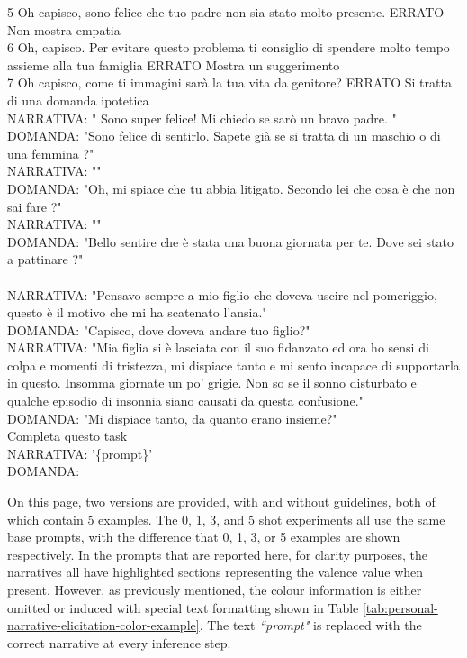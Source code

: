 \begin{itemize}
{       5	Oh capisco, sono felice che tuo padre non sia stato molto presente.	ERRATO	Non mostra empatia\\
       6	Oh, capisco. Per evitare questo problema ti consiglio di spendere molto tempo assieme alla tua famiglia	ERRATO	Mostra un suggerimento\\
       7	Oh capisco, come ti immagini sarà la tua vita da genitore?	ERRATO	Si tratta di una domanda ipotetica\\
      NARRATIVA: " Sono super felice! Mi chiedo se sarò un bravo padre. "\\
       DOMANDA: "Sono felice di sentirlo. Sapete già se si tratta di un maschio o di una femmina ?"\\
       NARRATIVA: ""\\
       DOMANDA: "Oh, mi spiace che tu abbia litigato. Secondo lei che cosa è che non sai fare ?"\\
       NARRATIVA: ""\\
       DOMANDA: "Bello sentire che è stata una buona giornata per te. Dove sei stato a pattinare ?"\\
       \\
       NARRATIVA: "Pensavo sempre a mio figlio che doveva uscire nel pomeriggio, questo è il motivo che mi ha scatenato l’ansia."\\
       DOMANDA: "Capisco, dove doveva andare tuo figlio?"\\
       NARRATIVA: "Mia figlia si è lasciata con il suo fidanzato ed ora ho sensi di colpa e momenti di tristezza, mi dispiace tanto e mi sento incapace di supportarla in questo. Insomma giornate un po’ grigie. Non so se il sonno disturbato e qualche episodio di insonnia siano causati da questa confusione."\\
       DOMANDA: "Mi dispiace tanto, da quanto erano insieme?"\\
       Completa questo task\\
       NARRATIVA:  '\{prompt\}'\\
       DOMANDA:}
\end{itemize}
On this page, two versions are provided, with and without guidelines, both of which contain 5 examples. The 0, 1, 3, and 5 shot experiments all use the same base prompts, with the difference that 0, 1, 3, or 5 examples are shown respectively. In the prompts that are reported here, for clarity purposes, the narratives all have highlighted sections representing the valence value when present. However, as previously mentioned, the colour information is either omitted or induced with special text formatting shown in Table \ref{tab:personal-narrative-elicitation-color-example}. The text \emph{``prompt"} is replaced with the correct narrative at every inference step.
